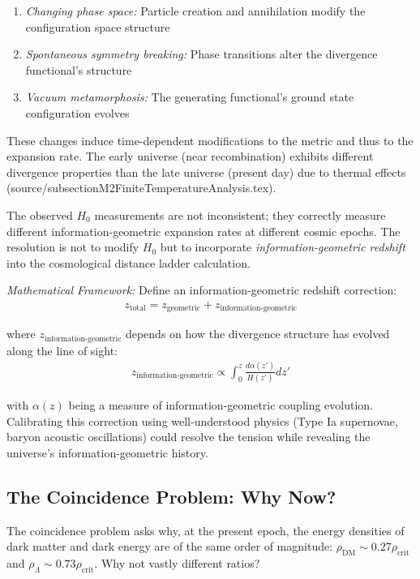 \documentclass[12pt,a4paper]{article}
\begin{document}
\begin{enumerate}
\item \textit{Changing phase space:} Particle creation and annihilation modify the configuration space structure
\item \textit{Spontaneous symmetry breaking:} Phase transitions alter the divergence functional's structure
\item \textit{Vacuum metamorphosis:} The generating functional's ground state configuration evolves
\end{enumerate}

These changes induce time-dependent modifications to the metric and thus to the expansion rate. The early universe (near recombination) exhibits different divergence properties than the late universe (present day) due to thermal effects (source/subsectionM2FiniteTemperatureAnalysis.tex).

The observed $H_0$ measurements are not inconsistent; they correctly measure different information-geometric expansion rates at different cosmic epochs. The resolution is not to modify $H_0$ but to incorporate \textit{information-geometric redshift} into the cosmological distance ladder calculation.

\textit{Mathematical Framework:} Define an information-geometric redshift correction:
\begin{align}
z_{\text{total}} = z_{\text{geometric}} + z_{\text{information-geometric}}
\end{align}

where $z_{\text{information-geometric}}$ depends on how the divergence structure has evolved along the line of sight:
\begin{align}
z_{\text{information-geometric}} \propto \int_0^z \frac{d\alpha(z')}{H(z')} dz'
\end{align}

with $\alpha(z)$ being a measure of information-geometric coupling evolution. Calibrating this correction using well-understood physics (Type Ia supernovae, baryon acoustic oscillations) could resolve the tension while revealing the universe's information-geometric history.

\subsection{The Coincidence Problem: Why Now?}

The coincidence problem asks why, at the present epoch, the energy densities of dark matter and dark energy are of the same order of magnitude: $\rho_{\text{DM}} \sim 0.27 \rho_{\text{crit}}$ and $\rho_\Lambda \sim 0.73 \rho_{\text{crit}}$. Why not vastly different ratios?
\end{document}
